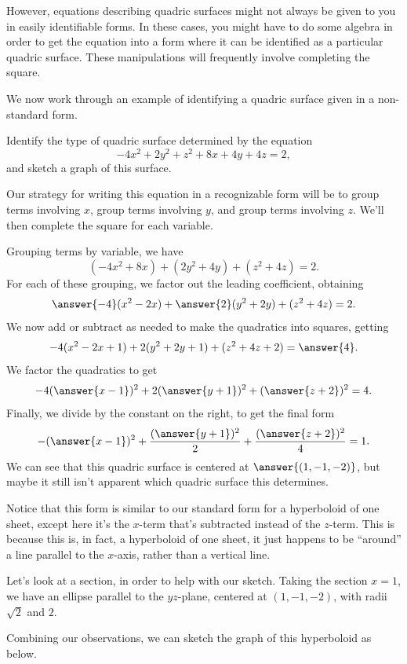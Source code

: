 \documentclass{ximera}
\begin{document}
However, equations describing quadric surfaces might not always be given to you in easily identifiable forms. In these cases, you might have to do some algebra in order to get the equation into a form where it can be identified as a particular quadric surface. These manipulations will frequently involve completing the square.

We now work through an example of identifying a quadric surface given in a non-standard form.

\begin{example}
Identify the type of quadric surface determined by the equation
\[
-4x^2 + 2y^2 + z^2 + 8x + 4y+4z = 2,
\]
and sketch a graph of this surface.

Our strategy for writing this equation in a recognizable form will be to group terms involving $x$, group terms involving $y$, and group terms involving $z$. We'll then complete the square for each variable.

Grouping terms by variable, we have
\[
(-4x^2+8x) + (2y^2 + 4y) + (z^2 + 4z) = 2.
\]
For each of these grouping, we factor out the leading coefficient, obtaining
\[
\answer{-4}(x^2-2x) + \answer{2}(y^2 + 2y) + (z^2 + 4z) = 2.
\]
We now add or subtract as needed to make the quadratics into squares, getting
\[
-4(x^2-2x + 1) + 2(y^2 + 2y + 1) + (z^2 + 4z + 2) = \answer{4}.
\]
We factor the quadratics to get
\[
-4(\answer{x-1})^2 + 2(\answer{y+1})^2 + (\answer{z+2})^2 = 4.
\]
Finally, we divide by the constant on the right, to get the final form
\[
-(\answer{x-1})^2 + \frac{(\answer{y+1})^2}{2} + \frac{(\answer{z+2})^2}{4} = 1.
\]
We can see that this quadric surface is centered at $\answer{(1,-1,-2)}$, but maybe it still isn't apparent which quadric surface this determines.

Notice that this form is similar to our standard form for a hyperboloid of one sheet, except here it's the $x$-term that's subtracted instead of the $z$-term. This is because this is, in fact, a hyperboloid of one sheet, it just happens to be ``around'' a line parallel to the $x$-axis, rather than a vertical line.

Let's look at a section, in order to help with our sketch. Taking the section $x = 1$, we have an ellipse parallel to the $yz$-plane, centered at $(1,-1,-2)$, with radii $\sqrt{2}$ and $2$.

Combining our observations, we can sketch the graph of this hyperboloid as below.


\end{example}
\end{document}
